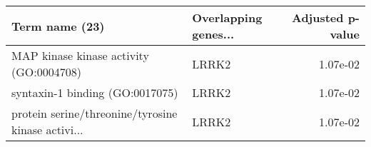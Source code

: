 \begin{tabular}{llr}
\toprule
                                    Term name (23) & Overlapping genes... &  Adjusted p-value \\
\midrule
           MAP kinase kinase activity (GO:0004708) &                LRRK2 &          1.07e-02 \\
                   syntaxin-1 binding (GO:0017075) &                LRRK2 &          1.07e-02 \\
protein serine/threonine/tyrosine kinase activi... &                LRRK2 &          1.07e-02 \\
\bottomrule
\end{tabular}
